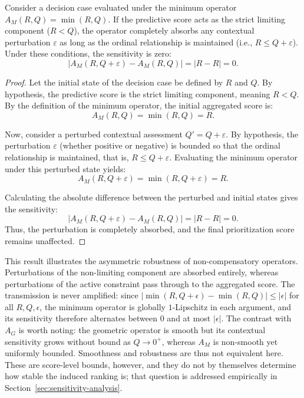 \documentclass[mathematics,article,submit,moreauthors]{Definitions/mdpi}
\begin{document}
\begin{Corollary}
    \label{cor:min-noise}
    Consider a decision case evaluated under the minimum operator $A_M(R,Q) = \min(R,Q)$. If the predictive score acts as the strict limiting component ($R < Q$), the operator completely absorbs any contextual perturbation $\varepsilon$ as long as the ordinal relationship is maintained (i.e., $R \le Q + \varepsilon$). Under these conditions, the sensitivity is zero:
    $$ \bigl| A_M(R, Q+\varepsilon) - A_M(R, Q) \bigr| = |R - R| = 0. $$
\end{Corollary}
\begin{proof}
    Let the initial state of the decision case be defined by $R$ and $Q$. By hypothesis, the predictive score is the strict limiting component, meaning $R < Q$. By the definition of the minimum operator, the initial aggregated score is:
    $$ A_M(R, Q) = \min(R, Q) = R. $$
    
    Now, consider a perturbed contextual assessment $Q' = Q + \varepsilon$. {\color{teal}By hypothesis, the perturbation $\varepsilon$ (whether positive or negative) is bounded so that the ordinal relationship is maintained, that is, $R \le Q + \varepsilon$.} Evaluating the minimum operator under this perturbed state yields:
    $$ A_M(R, Q+\varepsilon) = \min(R, Q+\varepsilon) = R. $$
    
    Calculating the absolute difference between the perturbed and initial states gives the sensitivity:
    $$ \bigl| A_M(R, Q+\varepsilon) - A_M(R, Q) \bigr| = | R - R | = 0. $$
    Thus, the perturbation is completely absorbed, and the final prioritization score remains unaffected.
\end{proof}

{\color{teal}This result illustrates the asymmetric robustness of
non-compensatory operators. Perturbations of the non-limiting component are
absorbed entirely, whereas perturbations of the active constraint pass
through to the aggregated score. The transmission is never amplified: since
$|\min(R,Q+\epsilon)-\min(R,Q)|\le|\epsilon|$ for all $R,Q,\epsilon$, the
minimum operator is globally $1$-Lipschitz in each argument, and its
sensitivity therefore alternates between $0$ and at most $|\epsilon|$. The
contrast with $A_G$ is worth noting: the geometric operator is smooth but
its contextual sensitivity grows without bound as $Q\to0^+$, whereas $A_M$
is non-smooth yet uniformly bounded. Smoothness and robustness are thus not
equivalent here. These are score-level bounds, however, and they do not by
themselves determine how stable the induced ranking is; that question is
addressed empirically in
Section~\ref{sec:sensitivity-analysis}.}
\end{document}
